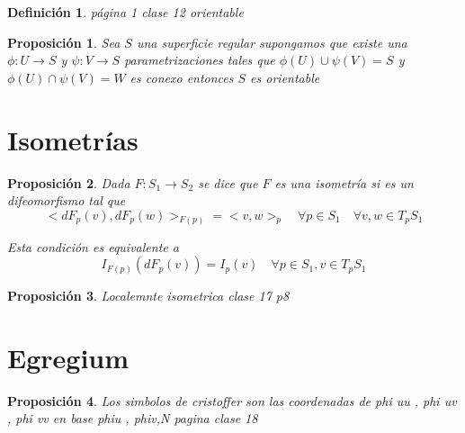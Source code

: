 \documentclass[12pt]{book}
\theoremstyle{break}
\newtheorem{proposition}{Proposición}
\newtheorem{definition}{Definición}[section]
\begin{document}
\begin{definition}
    página 1 clase 12 orientable
\end{definition}

\begin{proposition}
    Sea $S$ una superficie regular supongamos que existe una $\phi:U\rightarrow S$ y $\psi:V\rightarrow S$
    parametrizaciones tales que $\phi(U)\cup \psi(V) = S$ y $\phi(U)\cap \psi(V) = W$ es conexo entonces 
    $S$ es orientable
\end{proposition}

\section{Isometrías}
\begin{proposition}
  Dada $F:S_1\rightarrow S_2$ se dice que $F$ es una isometría si es un difeomorfismo tal que
  $$<dF_p(v),dF_p(w)>_{F(p)} = <v,w>_p \quad \forall p\in S_1 \quad \forall v,w \in T_pS_1$$

  Esta condición es equivalente a $$ I_{F(p)}(dF_p(v)) = I_p(v) \quad \forall p \in S_1 , v \in T_pS_1$$
\end{proposition}

\begin{proposition}
  Localemnte isometrica clase 17 p8    
\end{proposition}

\section{Egregium}
\begin{proposition}
    Los simbolos de cristoffer son las coordenadas de phi uu , phi uv , phi vv en base phiu , phiv,N 
    pagina clase 18 
\end{proposition}
\end{document}
